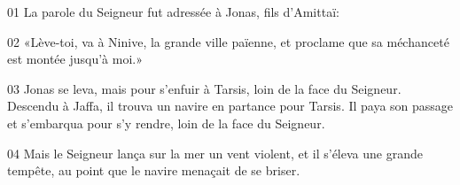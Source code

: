 01 La parole du Seigneur fut adressée à Jonas, fils d’Amittaï:

02 «Lève-toi, va à Ninive, la grande ville païenne, et proclame que sa méchanceté est montée jusqu’à moi.»

03 Jonas se leva, mais pour s’enfuir à Tarsis, loin de la face du Seigneur. Descendu à Jaffa, il trouva un navire en partance pour Tarsis. Il paya son passage et s’embarqua pour s’y rendre, loin de la face du Seigneur.

04 Mais le Seigneur lança sur la mer un vent violent, et il s’éleva une grande tempête, au point que le navire menaçait de se briser.

